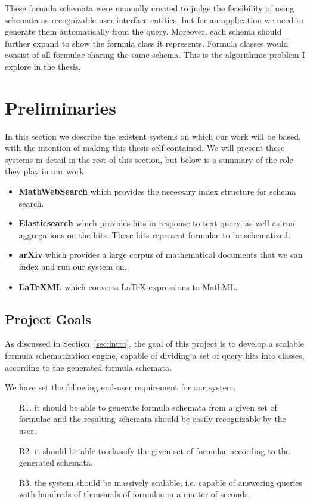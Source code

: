 \documentclass[a4paper,oneside]{article}
\def\latexml{\LaTeX{ML}\xspace}
\def\latex{\LaTeX\xspace}
\begin{document}
These formula schemata were manually created to judge the feasibility of using
schemata as recognizable user interface entities, but for an application we
need to generate them automatically from the query. Moreover, each schema
should further expand to show the formula class it represents. Formula classes
would consist of all formulae sharing the same schema. This is the algorithmic
problem I explore in the thesis.


\section{Preliminaries}\label{sec:prelim}

In this section we describe the existent systems on which our work will be
based, with the intention of making this thesis self-contained. We will
present these systems in detail in the rest of this section, but
below is a summary of the role they play in our work:
\begin{itemize}
\item \textbf{MathWebSearch} which provides the necessary index structure
for schema search.
\item \textbf{Elasticsearch} which provides hits in response to text query,
    as well as run aggregations on the hits.
    These hits represent formulae to be schematized.
\item \textbf{arXiv} which provides a large corpus of mathematical documents
    that we can index and run our system on.
\item \textbf{\latexml} which converts {\latex} expressions to MathML.
\end{itemize}

\subsection{Project Goals}\label{subsec:prelim:goals}
As discussed in Section~\ref{sec:intro}, the goal of this project is to
develop a scalable formula schematization engine, capable of dividing a set of
query hits into classes, according to the generated formula schemata.

We have set the following end-user requirement for our system:
\begin{enumerate}
    \item[R1.] it should be able to generate formula schemata from a given set
        of formulae and the resulting schemata should be easily recognizable by
        the user.
    \item[R2.] it should be able to classify the given set of formulae
        according to the generated schemata.
    \item[R3.] the system should be massively scalable, i.e. capable of
        answering queries with hundreds of thousands of formulae in a matter of
        seconds.
\end{enumerate}
\end{document}
